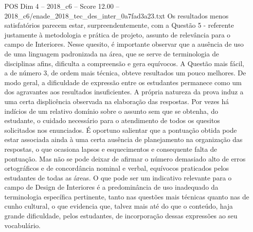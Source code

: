 \begin{textsample}{POS Dim 4 – 2018\_c6 – Score 12.00 – 2018\_c6/enade\_2018\_tec\_des\_inter\_0a7fad3a23.txt}
Os resultados menos satisfatórios parecem estar, surpreendentemente, com a Questão 5 - referente justamente à metodologia e prática de projeto, assunto de relevância para o campo de Interiores.
Nesse quesito, é importante observar que a ausência de uso de uma linguagem padronizada na área, que se serve de terminologia de disciplinas afins, dificulta a compreensão e gera equívocos.
A Questão mais fácil, a de número 3, de ordem mais técnica, obteve resultados um pouco melhores.
De modo geral, a dificuldade de expressão entre os estudantes permanece como um dos agravantes aos resultados insuficientes.
A própria natureza da prova induz a uma certa displicência observada na elaboração das respostas.
Por vezes há indícios de um relativo domínio sobre o assunto sem que se obtenha, do estudante, o cuidado necessário para o atendimento de todos os quesitos solicitados nos enunciados.
É oportuno salientar que a pontuação obtida pode estar associada ainda à uma certa ausência de planejamento na organização das respostas, o que ocasiona lapsos e esquecimentos e consequente falta de pontuação.
Mas não se pode deixar de afirmar o número demasiado alto de erros ortográficos e de concordância nominal e verbal, equívocos praticados pelos estudantes de todas as áreas.
O que pode ser um indicativo relevante para o campo de Design de Interiores é a predominância de uso inadequado da terminologia específica pertinente, tanto nas questões mais técnicas quanto nas de cunho cultural, o que evidencia que, talvez mais até do que o conteúdo, haja grande dificuldade, pelos estudantes, de incorporação dessas expressões ao seu vocabulário.

\end{textsample}
